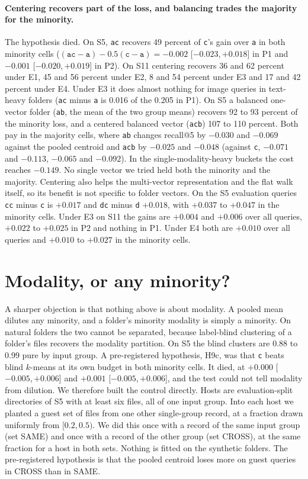 \documentclass[11pt]{article}
\newcommand{\rep}[1]{\texttt{#1}}
\newcommand{\ci}[2]{[\ensuremath{#1},\,\ensuremath{#2}]}  %
\begin{document}
\paragraph{Centering recovers part of the loss, and balancing trades the majority for the minority.} The hypothesis died. On S5, \rep{ac} recovers 49 percent of \rep{c}'s gain over \rep{a} in both minority cells ($(\rep{ac} - \rep{a}) - 0.5(\rep{c} - \rep{a}) = -0.002$ \ci{-0.023}{+0.018} in P1 and $-0.001$ \ci{-0.020}{+0.019} in P2). On S11 centering recovers 36 and 62 percent under E1, 45 and 56 percent under E2, 8 and 54 percent under E3 and 17 and 42 percent under E4. Under E3 it does almost nothing for image queries in text-heavy folders (\rep{ac} minus \rep{a} is 0.016 of the 0.205 in P1). On S5 a balanced one-vector folder (\rep{ab}, the mean of the two group means) recovers 92 to 93 percent of the minority loss, and a centered balanced vector (\rep{acb}) 107 to 110 percent. Both pay in the majority cells, where \rep{ab} changes recall@5 by $-0.030$ and $-0.069$ against the pooled centroid and \rep{acb} by $-0.025$ and $-0.048$ (against \rep{c}, $-0.071$ and $-0.113$, $-0.065$ and $-0.092$). In the single-modality-heavy buckets the cost reaches $-0.149$. No single vector we tried held both the minority and the majority. Centering also helps the multi-vector representation and the flat walk itself, so its benefit is not specific to folder vectors. On the S5 evaluation queries \rep{cc} minus \rep{c} is $+0.017$ and \rep{dc} minus \rep{d} $+0.018$, with $+0.037$ to $+0.047$ in the minority cells. Under E3 on S11 the gains are $+0.004$ and $+0.006$ over all queries, $+0.022$ to $+0.025$ in P2 and nothing in P1. Under E4 both are $+0.010$ over all queries and $+0.010$ to $+0.027$ in the minority cells.

\section{Modality, or any minority?}
\label{sec:dilution}

A sharper objection is that nothing above is about modality. A pooled mean dilutes any minority, and a folder's minority modality is simply a minority. On natural folders the two cannot be separated, because label-blind clustering of a folder's files recovers the modality partition. On S5 the blind clusters are 0.88 to 0.99 pure by input group. A pre-registered hypothesis, H9c, was that \rep{c} beats blind $k$-means at its own budget in both minority cells. It died, at $+0.000$ \ci{-0.005}{+0.006} and $+0.001$ \ci{-0.005}{+0.006}, and the test could not tell modality from dilution. We therefore built the control directly. Hosts are evaluation-split directories of S5 with at least six files, all of one input group. Into each host we planted a guest set of files from one other single-group record, at a fraction drawn uniformly from $[0.2, 0.5)$. We did this once with a record of the same input group (set SAME) and once with a record of the other group (set CROSS), at the same fraction for a host in both sets. Nothing is fitted on the synthetic folders. The pre-registered hypothesis is that the pooled centroid loses more on guest queries in CROSS than in SAME.
\end{document}
